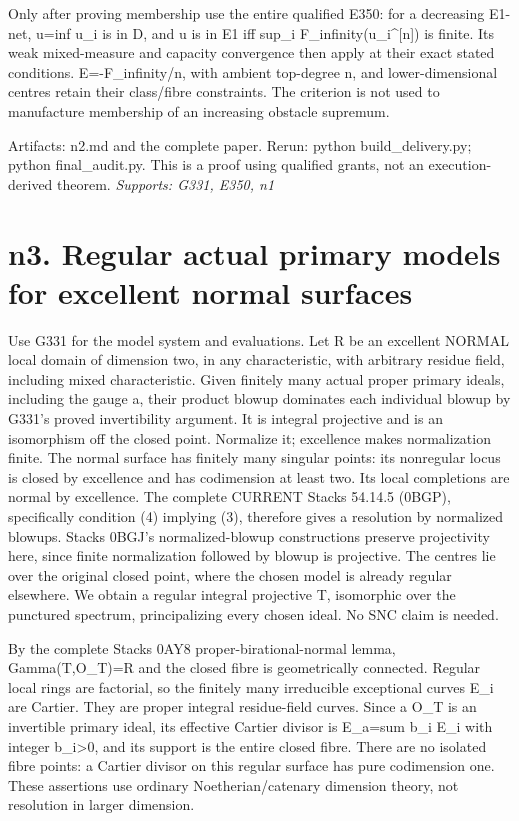 \documentclass[11pt]{article}
\begin{document}
Only after proving membership use the entire qualified E350: for a decreasing E1-net, u=inf u\_i is in D, and u is in E1 iff sup\_i F\_infinity(u\_i\textasciicircum{}[n]) is finite. Its weak mixed-measure and capacity convergence then apply at their exact stated conditions. E=-F\_infinity/n, with ambient top-degree n, and lower-dimensional centres retain their class/fibre constraints. The criterion is not used to manufacture membership of an increasing obstacle supremum.

Artifacts: n2.md and the complete paper. Rerun: python build\_delivery.py; python final\_audit.py. This is a proof using qualified grants, not an execution-derived theorem.
\textit{Supports: G331, E350, n1}

\section{n3. Regular actual primary models for excellent normal surfaces}

Use G331 for the model system and evaluations. Let R be an excellent NORMAL local domain of dimension two, in any characteristic, with arbitrary residue field, including mixed characteristic. Given finitely many actual proper primary ideals, including the gauge a, their product blowup dominates each individual blowup by G331's proved invertibility argument. It is integral projective and is an isomorphism off the closed point. Normalize it; excellence makes normalization finite. The normal surface has finitely many singular points: its nonregular locus is closed by excellence and has codimension at least two. Its local completions are normal by excellence. The complete CURRENT Stacks 54.14.5 (0BGP), specifically condition (4) implying (3), therefore gives a resolution by normalized blowups. Stacks 0BGJ's normalized-blowup constructions preserve projectivity here, since finite normalization followed by blowup is projective. The centres lie over the original closed point, where the chosen model is already regular elsewhere. We obtain a regular integral projective T, isomorphic over the punctured spectrum, principalizing every chosen ideal. No SNC claim is needed.

By the complete Stacks 0AY8 proper-birational-normal lemma, Gamma(T,O\_T)=R and the closed fibre is geometrically connected. Regular local rings are factorial, so the finitely many irreducible exceptional curves E\_i are Cartier. They are proper integral residue-field curves. Since a O\_T is an invertible primary ideal, its effective Cartier divisor is E\_a=sum b\_i E\_i with integer b\_i>0, and its support is the entire closed fibre. There are no isolated fibre points: a Cartier divisor on this regular surface has pure codimension one. These assertions use ordinary Noetherian/catenary dimension theory, not resolution in larger dimension.
\end{document}
